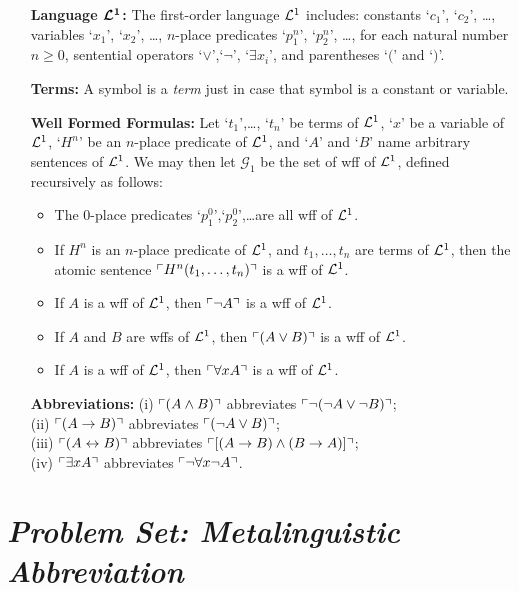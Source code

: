 \documentclass[a4paper, 11pt]{article} %
\begin{document}
\begin{enumerate}[leftmargin=1.2in,labelsep=.15in] %
\item[\bf Language $\boldsymbol{\mathcal{L}^1}$:] The first-order language $\mathcal{L}^1$ includes: constants `$c_1$', `$c_2$', \dots, variables `$x_1$', `$x_2$', \dots, $n$-place predicates `$p_1^n$', `$p_2^n$', \dots, for each natural number $n\geq0$, sentential operators `$\vee$',`$\neg$', `$\exists x_i$', and parentheses `$($' and `$)$'.
\item[\bf Terms:] A symbol is a \textit{term} just in case that symbol is a constant or variable.
\item[\bf Well Formed Formulas:] Let `$t_1$',\dots, `$t_n$' be terms of $\mathcal{L}^1$, `$x$' be a variable of $\mathcal{L}^1$, `$H^n$' be an $n$-place predicate of $\mathcal{L}^1$, and `$A$' and `$B$' name arbitrary sentences of $\mathcal{L}^1$. We may then let $\mathcal{G}_1$ be the set of wff of $\mathcal{L}^1$, defined recursively as follows:
\begin{itemize}
\item The 0-place predicates `$p_1^0$',`$p_2^0$',\dots are all wff of $\mathcal{L}^1$.
\item If ${H^n}$ is an $n$-place predicate of $\mathcal{L}^1$, and ${t_1},\dots,{t_n}$ are terms of $\mathcal{L}^1$, then the atomic sentence $\ulcorner H^n(t_1,\dots,t_n)\urcorner$ is a wff of $\mathcal{L}^1$.
\item If ${A}$ is a wff of $\mathcal{L}^1$, then $\ulcorner\neg A\urcorner$ is a wff of $\mathcal{L}^1$.
\item If ${A}$ and ${B}$ are wffs of $\mathcal{L}^1$, then $\ulcorner(A\vee B)\urcorner$ is a wff of $\mathcal{L}^1$.
\item If ${A}$ is a wff of $\mathcal{L}^1$, then $\ulcorner\forall xA\urcorner$ is a wff of $\mathcal{L}^1$.
\end{itemize}
\item[\bf Abbreviations:] (i) $\ulcorner(A\wedge B)\urcorner$ abbreviates $\ulcorner\neg(\neg A\vee\neg B)\urcorner$;\\ (ii) $\ulcorner(A\rightarrow B)\urcorner$ abbreviates $\ulcorner(\neg A\vee B)\urcorner$;\\ (iii) $\ulcorner(A\leftrightarrow B)\urcorner$ abbreviates $\ulcorner[(A\rightarrow B)\wedge(B\rightarrow A)]\urcorner$;\\ (iv) $\ulcorner\exists xA\urcorner$ abbreviates $\ulcorner\neg\forall x\neg A\urcorner$.
\end{enumerate}



\section*{\it Problem Set: Metalinguistic Abbreviation}
\end{document}
